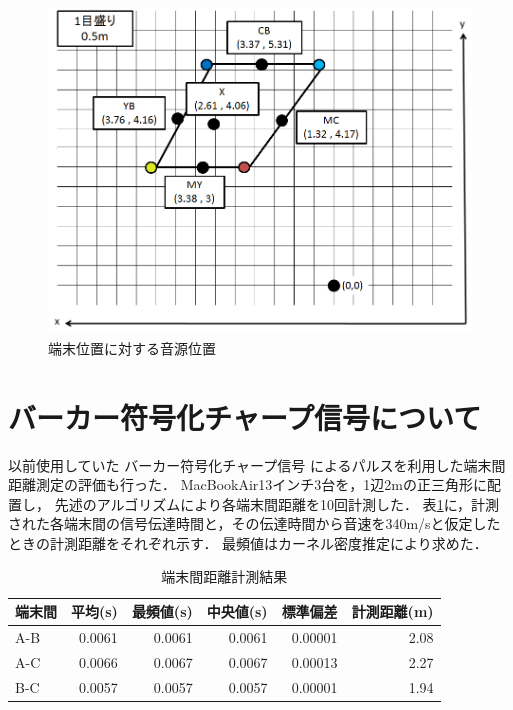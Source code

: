 \begin{figure}[p]
  \centering
  \includegraphics[clip,width=1.05\hsize]{img/ongenichi.png}
  \caption{端末位置に対する音源位置}\label{fig:ongenichi}
\end{figure}






\section{バーカー符号化チャープ信号について}
以前使用していた\cite{self_ac} バーカー符号化チャープ信号 によるパルスを利用した端末間距離測定の評価も行った．
MacBookAir13インチ3台を，1辺2mの正三角形に配置し，
先述のアルゴリズムにより各端末間距離を10回計測した．
表\ref{tab:estdistance}に，計測された各端末間の信号伝達時間と，その伝達時間から音速を340m/sと仮定したときの計測距離をそれぞれ示す．
最頻値はカーネル密度推定により求めた．

\begin{table}[p]\centering
  \caption{端末間距離計測結果}
  \label{tab:estdistance}
  \begin{tabular}{l|rrrrr}
    \hline
    端末間&平均(s)&最頻値(s)&中央値(s)&標準偏差&計測距離(m)\\
    \hline
    A-B&0.0061&0.0061&0.0061&0.00001&2.08\\
    A-C&0.0066&0.0067&0.0067&0.00013&2.27\\
    B-C&0.0057&0.0057&0.0057&0.00001&1.94\\
    \hline
  \end{tabular}
\end{table}


